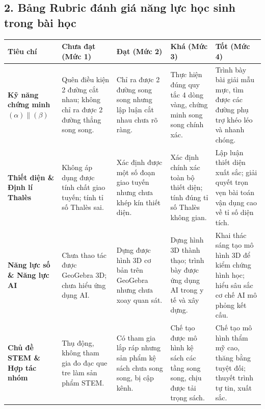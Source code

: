 \documentclass[12pt, a4paper]{article}
\begin{document}
\subsection*{2. Bảng Rubric đánh giá năng lực học sinh trong bài học}

\begin{center}
\small
\begin{tabularx}{\textwidth}{|p{2.8cm}|X|X|X|X|}
\hline
\textbf{Tiêu chí} & \textbf{Chưa đạt (Mức 1)} & \textbf{Đạt (Mức 2)} & \textbf{Khá (Mức 3)} & \textbf{Tốt (Mức 4)} \\ \hline
\textbf{Kỹ năng chứng minh $(\alpha) \parallel (\beta)$} & Quên điều kiện 2 đường cắt nhau; không chỉ ra được 2 đường thẳng song song. & Chỉ ra được 2 đường song song nhưng lập luận cắt nhau chưa rõ ràng. & Thực hiện đúng quy tắc 4 dòng vàng, chứng minh song song chính xác. & Trình bày bài giải mẫu mực, tìm được các đường phụ trợ khéo léo và nhanh chóng. \\ \hline
\textbf{Thiết diện \& Định lí Thalès} & Không áp dụng được tính chất giao tuyến; tính tỉ số Thalès sai. & Xác định được một số đoạn giao tuyến nhưng chưa khép kín thiết diện. & Xác định chính xác toàn bộ thiết diện; tính đúng tỉ số Thalès không gian. & Lập luận thiết diện xuất sắc; giải quyết trọn vẹn bài toán vận dụng cao về tỉ số diện tích. \\ \hline
\textbf{Năng lực số \& Năng lực AI} & Chưa thao tác được GeoGebra 3D; chưa hiểu ứng dụng AI. & Dựng được hình 3D cơ bản trên GeoGebra nhưng chưa xoay quan sát. & Dựng hình 3D thành thạo; trình bày được ứng dụng AI trong y tế và xây dựng. & Khai thác sáng tạo mô hình 3D để kiểm chứng hình học; hiểu sâu sắc cơ chế AI mô phỏng kết cấu. \\ \hline
\textbf{Chủ đề STEM \& Hợp tác nhóm} & Thụ động, không tham gia đo đạc que tre làm sản phẩm STEM. & Có tham gia lắp ráp nhưng sản phẩm kệ sách chưa song song, bị cập kênh. & Chế tạo được mô hình kệ sách các tầng song song, chịu được tải trọng sách. & Chế tạo mô hình thẩm mỹ cao, thăng bằng tuyệt đối; thuyết trình tự tin, xuất sắc. \\ \hline
\end{tabularx}
\end{center}
\end{document}
